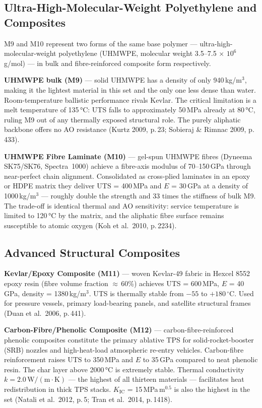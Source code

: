 \documentclass[11pt,a4paper]{article}
\begin{document}
\subsection*{Ultra-High-Molecular-Weight Polyethylene and Composites}

M9 and M10 represent two forms of the same base polymer — ultra-high-molecular-weight
polyethylene (UHMWPE, molecular weight 3.5--7.5$\,\times\,10^{6}$\,g/mol) — in bulk
and fibre-reinforced composite form respectively.

\textbf{UHMWPE bulk (M9)} — solid UHMWPE has a density of only 940\,kg/m$^{3}$,
making it the lightest material in this set and the only one less dense than water.
Room-temperature ballistic performance rivals Kevlar. The critical limitation is a
melt temperature of 135\,°C: UTS falls to approximately 50\,MPa already at 80\,°C,
ruling M9 out of any thermally exposed structural role. The purely aliphatic backbone
offers no AO resistance (Kurtz 2009, p.\,23; Sobieraj \& Rimnac 2009, p.\,433).

\textbf{UHMWPE Fibre Laminate (M10)} — gel-spun UHMWPE fibres (Dyneema SK75/SK76,
Spectra~1000) achieve a fibre-axis modulus of 70--150\,GPa through near-perfect chain
alignment. Consolidated as cross-plied laminates in an epoxy or HDPE matrix they
deliver UTS = 400\,MPa and $E$ = 30\,GPa at a density of 1000\,kg/m$^{3}$ —
roughly double the strength and 33 times the stiffness of bulk M9. The trade-off is
identical thermal and AO sensitivity: service temperature is limited to 120\,°C by
the matrix, and the aliphatic fibre surface remains susceptible to atomic oxygen
(Koh et al.\ 2010, p.\,2234).

\subsection*{Advanced Structural Composites}

\textbf{Kevlar/Epoxy Composite (M11)} — woven Kevlar-49 fabric in Hexcel 8552
epoxy resin (fibre volume fraction $\approx$\,60\%) achieves UTS = 600\,MPa,
$E$ = 40\,GPa, density = 1380\,kg/m$^{3}$. UTS is thermally stable from
$-55$ to $+180\,^{\circ}$C. Used for pressure vessels, primary load-bearing
panels, and satellite structural frames (Duan et al.\ 2006, p.\,441).

\textbf{Carbon-Fibre/Phenolic Composite (M12)} — carbon-fibre-reinforced phenolic
composites constitute the primary ablative TPS for solid-rocket-booster (SRB)
nozzles and high-heat-load atmospheric re-entry vehicles. Carbon-fibre
reinforcement raises UTS to 350\,MPa and $E$ to 35\,GPa compared to neat
phenolic resin. The char layer above 2000\,°C is extremely stable. Thermal
conductivity $k = 2.0\,\mathrm{W/(m\cdot K)}$ — the highest of all thirteen
materials — facilitates heat redistribution in thick TPS stacks.
$K_{\mathrm{IC}}$ = 15\,MPa$\,\mathrm{m}^{0.5}$ is also the highest in the set
(Natali et al.\ 2012, p.\,5; Tran et al.\ 2014, p.\,1418).
\end{document}
